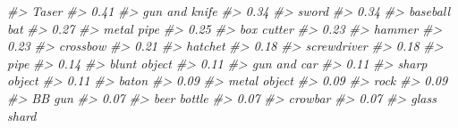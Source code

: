 \documentclass[
]{krantz}
\makeatletter
\newenvironment{Shaded}{\begin{snugshade}}{\end{snugshade}}
\newcommand{\CommentTok}[1]{\textcolor[rgb]{0.37,0.37,0.37}{\textit{#1}}}
\newenvironment{kframe}{%
\medskip{}
\setlength{\fboxsep}{.8em}
 \def\at@end@of@kframe{}%
 \ifinner\ifhmode%
  \def\at@end@of@kframe{\end{minipage}}%
  \begin{minipage}{\columnwidth}%
 \fi\fi%
 \def\FrameCommand##1{\hskip\@totalleftmargin \hskip-\fboxsep
 \colorbox{shadecolor}{##1}\hskip-\fboxsep
     \hskip-\linewidth \hskip-\@totalleftmargin \hskip\columnwidth}%
 \MakeFramed {\advance\hsize-\width
   \@totalleftmargin\z@ \linewidth\hsize
   \@setminipage}}%
 {\par\unskip\endMakeFramed%
 \at@end@of@kframe}
\renewenvironment{Shaded}{\begin{kframe}}{\end{kframe}}
\makeatother
\begin{document}
\begin{Shaded}
\begin{Highlighting}[]
\CommentTok{\#\textgreater{}                            Taser }
\CommentTok{\#\textgreater{}                             0.41 }
\CommentTok{\#\textgreater{}                    gun and knife }
\CommentTok{\#\textgreater{}                             0.34 }
\CommentTok{\#\textgreater{}                            sword }
\CommentTok{\#\textgreater{}                             0.34 }
\CommentTok{\#\textgreater{}                     baseball bat }
\CommentTok{\#\textgreater{}                             0.27 }
\CommentTok{\#\textgreater{}                       metal pipe }
\CommentTok{\#\textgreater{}                             0.25 }
\CommentTok{\#\textgreater{}                       box cutter }
\CommentTok{\#\textgreater{}                             0.23 }
\CommentTok{\#\textgreater{}                           hammer }
\CommentTok{\#\textgreater{}                             0.23 }
\CommentTok{\#\textgreater{}                         crossbow }
\CommentTok{\#\textgreater{}                             0.21 }
\CommentTok{\#\textgreater{}                          hatchet }
\CommentTok{\#\textgreater{}                             0.18 }
\CommentTok{\#\textgreater{}                      screwdriver }
\CommentTok{\#\textgreater{}                             0.18 }
\CommentTok{\#\textgreater{}                             pipe }
\CommentTok{\#\textgreater{}                             0.14 }
\CommentTok{\#\textgreater{}                     blunt object }
\CommentTok{\#\textgreater{}                             0.11 }
\CommentTok{\#\textgreater{}                      gun and car }
\CommentTok{\#\textgreater{}                             0.11 }
\CommentTok{\#\textgreater{}                     sharp object }
\CommentTok{\#\textgreater{}                             0.11 }
\CommentTok{\#\textgreater{}                            baton }
\CommentTok{\#\textgreater{}                             0.09 }
\CommentTok{\#\textgreater{}                     metal object }
\CommentTok{\#\textgreater{}                             0.09 }
\CommentTok{\#\textgreater{}                             rock }
\CommentTok{\#\textgreater{}                             0.09 }
\CommentTok{\#\textgreater{}                           BB gun }
\CommentTok{\#\textgreater{}                             0.07 }
\CommentTok{\#\textgreater{}                      beer bottle }
\CommentTok{\#\textgreater{}                             0.07 }
\CommentTok{\#\textgreater{}                          crowbar }
\CommentTok{\#\textgreater{}                             0.07 }
\CommentTok{\#\textgreater{}                      glass shard }

\end{Highlighting}
\end{Shaded}
\end{document}
